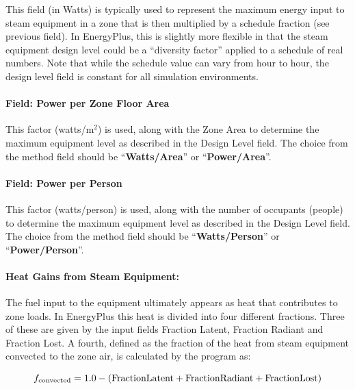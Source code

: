 This field (in Watts) is typically used to represent the maximum energy input to steam equipment in a zone that is then multiplied by a schedule fraction (see previous field). In EnergyPlus, this is slightly more flexible in that the steam equipment design level could be a ``diversity factor'' applied to a schedule of real numbers. Note that while the schedule value can vary from hour to hour, the design level field is constant for all simulation environments.

\paragraph{Field: Power per Zone Floor Area}\label{field-power-per-zone-floor-area-2}

This factor (watts/m\(^{2}\)) is used, along with the Zone Area to determine the maximum equipment level as described in the Design Level field. The choice from the method field should be ``\textbf{Watts/Area}'' or ``\textbf{Power/Area}''.

\paragraph{Field: Power per Person}\label{field-power-per-person-2}

This factor (watts/person) is used, along with the number of occupants (people) to determine the maximum equipment level as described in the Design Level field. The choice from the method field should be ``\textbf{Watts/Person}'' or ``\textbf{Power/Person}''.

\paragraph{Heat Gains from Steam Equipment:}\label{heat-gains-from-steam-equipment}

The fuel input to the equipment ultimately appears as heat that contributes to zone loads. In EnergyPlus this heat is divided into four different fractions. Three of these are given by the input fields Fraction Latent, Fraction Radiant and Fraction Lost. A fourth, defined as the fraction of the heat from steam equipment convected to the zone air, is calculated by the program as:

\begin{equation}
  f_{\rm{convected}} = 1.0 - (\rm{Fraction Latent} + \rm{Fraction Radiant} + \rm{Fraction Lost})
\end{equation}

